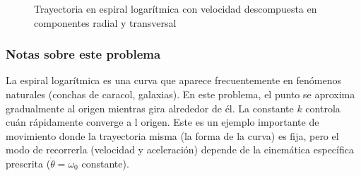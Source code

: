 \begin{figure}[!ht]
    \caption{Trayectoria en espiral logarítmica con velocidad descompuesta en componentes radial y transversal}
    \label{fig:c1_e01_p05_espiral}
\end{figure}

\newpage

\subsubsection*{Notas sobre este problema}

La espiral logarítmica es una curva que aparece frecuentemente en fenómenos naturales (conchas de caracol, galaxias). En este problema, el punto se aproxima gradualmente al origen mientras gira alrededor de él. La constante $k$ controla cuán rápidamente converge a l origen. Este es un ejemplo importante de movimiento donde la trayectoria misma (la forma de la curva) es fija, pero el modo de recorrerla (velocidad y aceleración) depende de la cinemática específica prescrita ($\dot{\theta} = \omega_0$ constante).
